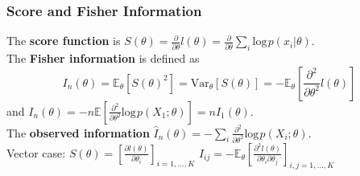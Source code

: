 \documentclass[10pt,twocolumn]{article}
\begin{document}
\subsubsection*{Score and Fisher Information}
The \textbf{score function} is $S(\theta) = \frac{\partial}{\partial\theta} l(\theta) = \frac{\partial}{\partial\theta} \sum_{i} \text{log} \hspace{1pt} p(x_{i}|\theta)$.\\
The \textbf{Fisher information} is defined as
\begin{equation}
    I_{n}(\theta) = \mathbb{E}_{\theta} \left[ S(\theta)^{2} \right] = \text{Var}_{\theta} \left[ S(\theta) \right] 
        = -\mathbb{E}_{\theta} \left[ \frac{\partial^{2}}{\partial\theta^{2}} l(\theta) \right]
\end{equation}
and $I_{n}(\theta) = -n\mathbb{E} \left[ \frac{\partial^{2}}{\partial\theta^{2}} \text{log}\hspace{1pt} p(X_{1};\theta) \right] = nI_{1}(\theta)$.\\
The \textbf{observed information} $\hat{I}_{n}(\theta) = -\sum_{i}\frac{\partial^{2}}{\partial\theta^{2}} \text{log}\hspace{1pt}p(X_{i};\theta)$.\\
Vector case: $S(\theta) = \left[ \frac{\partial l(\theta)}{\partial \theta_{i}} \right]_{i=1,\ldots,K}$ \hspace{1mm}
    $I_{ij} = -\mathbb{E}_{\theta}\left[\frac{\partial^{2} l(\theta)}{\partial\theta_{i}\partial\theta_{j}}\right]_{i,j=1,\ldots,K}$
\end{document}
